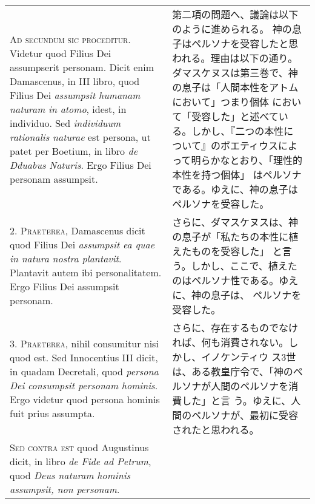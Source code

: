 \documentclass[10pt]{jsarticle} %
\begin{document}
\begin{longtable}{p{21em}p{21em}}

{\Huge A}{\scshape d secundum sic proceditur}. Videtur quod Filius Dei assumpserit
personam. Dicit enim Damascenus, in III libro, quod Filius Dei {\itshape assumpsit
humanam naturam in atomo}, idest, in individuo. Sed {\itshape individuum rationalis
naturae} est persona, ut patet per Boetium, in libro {\itshape de Dduabus
Naturis}. Ergo Filius Dei personam assumpsit.


&

第二項の問題へ、議論は以下のように進められる。
神の息子はペルソナを受容したと思われる。理由は以下の通り。
ダマスケヌスは第三巻で、神の息子は「人間本性をアトムにおいて」つまり個体
 において「受容した」と述べている。しかし、『二つの本性に
 ついて』のボエティウスによって明らかなとおり、「理性的本性を持つ個体」
 はペルソナである。ゆえに、神の息子はペルソナを受容した。


\\




2. {\scshape Praeterea}, Damascenus dicit quod Filius Dei {\itshape assumpsit ea quae in natura
nostra plantavit}. Plantavit autem ibi personalitatem. Ergo Filius Dei
assumpsit personam.


&

さらに、ダマスケヌスは、神の息子が「私たちの本性に植えたものを受容した」
 と言う。しかし、ここで、植えたのはペルソナ性である。ゆえに、神の息子は、
 ペルソナを受容した。


\\




3. {\scshape Praeterea}, nihil consumitur nisi quod est. Sed Innocentius III dicit, in
quadam Decretali, quod {\itshape persona Dei consumpsit personam hominis}. Ergo
videtur quod persona hominis fuit prius assumpta.


&

さらに、存在するものでなければ、何も消費されない。しかし、イノケンティウ
 ス3世は、ある教皇庁令で、「神のペルソナが人間のペルソナを消費した」と言
 う。ゆえに、人間のペルソナが、最初に受容されたと思われる。

\\




{\scshape Sed contra est} quod Augustinus dicit, in libro {\itshape de Fide ad Petrum}, quod
{\itshape Deus naturam hominis assumpsit, non personam}.


&


\end{longtable}
\end{document}
